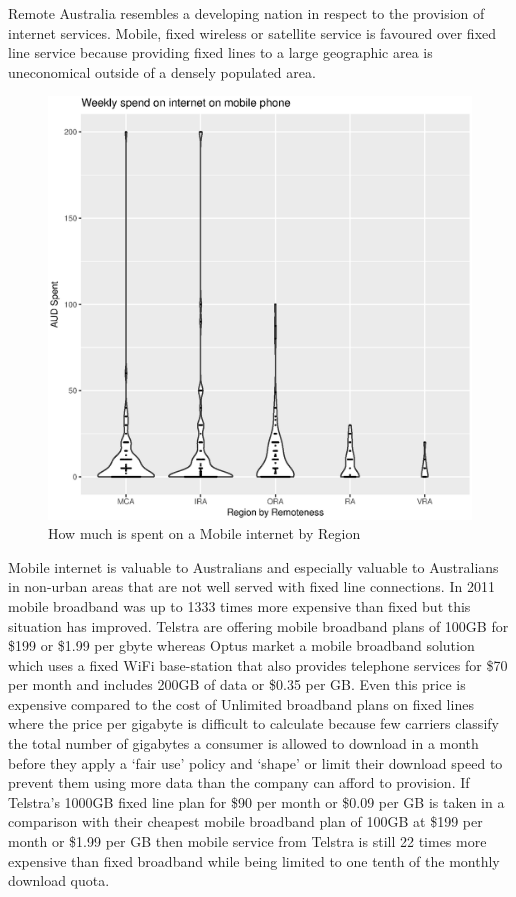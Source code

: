Remote Australia resembles a developing nation in respect to the provision of internet services. Mobile, fixed wireless or satellite service is favoured over fixed line service because providing fixed lines to a large geographic area is uneconomical outside of a densely populated area. 

\begin{figure}[ht]
\centering
\includegraphics[scale=0.5]{figures/Vchart14-WeeklySpendMobileInternet.eps}
\caption{How much is spent on a Mobile internet by Region} \label{fig:VC014MobileInternetSpendRegions}
\end{figure}


Mobile internet is valuable to Australians and especially valuable to Australians in non-urban areas that are not well served with fixed line connections. In 2011 mobile broadband was up to 1333 times more expensive than fixed but this situation has improved. Telstra are offering mobile broadband plans of 100GB for \$199 or \$1.99 per \acrshort{gbyte} whereas Optus market a mobile broadband solution which uses a fixed WiFi base-station that also provides telephone services for \$70 per month and includes 200GB of data or \$0.35 per GB\cite{RefWorks:413}. Even this price is expensive compared to the cost of Unlimited broadband plans on fixed lines where the price per gigabyte is difficult to calculate because few carriers classify the total number of gigabytes a consumer is allowed to download in a month before they apply a `fair use' policy and `shape' or limit their download speed to prevent them using more data than the company can afford to provision. If Telstra's 1000GB fixed line plan for \$90 per month or \$0.09 per GB is taken in a comparison with their cheapest mobile broadband plan of 100GB at \$199 per month or \$1.99 per GB then mobile service from Telstra is still 22 times more expensive than fixed broadband while being limited to one tenth of the monthly download quota.

